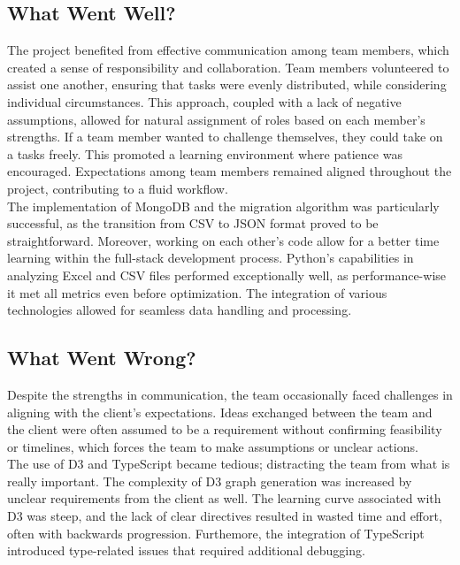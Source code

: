 \documentclass{article}
\begin{document}
\subsection{What Went Well?}

The project benefited from effective communication among team members, which
created a sense of responsibility and collaboration. Team members volunteered to
assist one another, ensuring that tasks were evenly distributed, while
considering individual circumstances. This approach, coupled with a lack of
negative assumptions, allowed for natural assignment of roles based on each
member's strengths. If a team member wanted to challenge themselves, they could
take on a tasks freely. This promoted a learning environment where patience was
encouraged. Expectations among team members remained aligned throughout the
project, contributing to a fluid workflow. \\

The implementation of MongoDB and the migration algorithm was particularly
successful, as the transition from CSV to JSON format proved to be
straightforward. Moreover, working on each other's code allow for a better time
learning within the full-stack development process. Python's capabilities in
analyzing Excel and CSV files performed exceptionally well, as performance-wise
it met all metrics even before optimization. The integration of various
technologies allowed for seamless data handling and processing.

\subsection{What Went Wrong?}

Despite the strengths in communication, the team occasionally faced challenges
in aligning with the client's expectations. Ideas exchanged between the team and
the client were often assumed to be a requirement without confirming feasibility
or  timelines, which forces the team to make assumptions or unclear actions. \\

The use of D3 and TypeScript became tedious; distracting the team from what is
really important. The complexity of D3 graph generation was increased by unclear
requirements from the client as well. The learning curve associated with D3 was
steep, and the lack of clear directives resulted in wasted time and effort,
often with backwards progression. Furthemore, the integration of TypeScript
introduced type-related issues that required additional debugging. 
\end{document}
